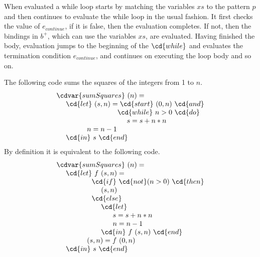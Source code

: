 \begin{syntax}
When evaluated a while loop starts by matching the variables $xs$ to
the pattern $p$ and then continues to evaluate the while loop in the
usual fashion.
%
It first checks the value of $e_{continue}$, if it is false, then the
evaluation completes.  
%
If not, then the  bindings in $b^{+}$, which can use the variables
$xs$, are evaluated.
%
Having finished the body, evaluation jumps to the beginning of the
$\cd{while}$ and evaluates the termination condition $e_{continue}$, and
continues on executing the loop body and so on. 
\end{syntax}


\begin{example}
The following code sums the squares of the integers from 1 to $n$.
%
\[
\begin{array}{l}
\cdvar{sumSquares}~(n) = 
\\
~~~~\cd{let}~(s,n) = \cd{start}~(0,n)~\cd{and} \\ 
~~~~~~~~~~~~~~~~~~~~~~~~~~\cd{while}~n > 0~\cd{do} \\
~~~~~~~~~~~~~~~~~~~~~~~~~~~~~~s = s + n * n \\
~~~~~~~~~~~~~n = n - 1\\
~~~~\cd{in}~s~\cd{end}
\end{array}
\]
%
By definition it is equivalent
to the following code.
\[
\begin{array}{l}
\cdvar{sumSquares}~(n) =\\ 
~~~~\cd{let}~f~(s, n) = \\ 
~~~~~~~~~~~~~~~\cd{if}~\cd{not} (n > 0) ~\cd{then}\\
~~~~~~~~~~~~~~~~~~~(s, n) \\
~~~~~~~~~~~~~~~\cd{else}\\
~~~~~~~~~~~~~~~~~~~\cd{let} \\
~~~~~~~~~~~~~~~~~~~~~~~~s = s + n * n \\
~~~~~~~~~~~~~~~~~~~~~~~~n = n - 1 \\
~~~~~~~~~~~~~~~~~~~\cd{in}~f~(s, n)~\cd{end}\\
~~~~~~~~~~~~~(s, n) = f~(0, n)\\
~~~~\cd{in}~s~\cd{end}
\end{array}
\]
\end{example}

